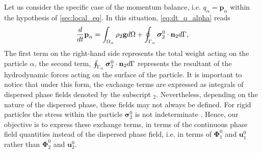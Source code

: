 Let us consider the specific case of the momentum balance, i.e. $q_\alpha = \textbf{p}_\alpha$ within the hypothesis of \ref{sec:local_eq}.
In this situation, \ref{eq:dt_q_alpha} reads
\begin{equation}
    \ddt  \textbf{p}_\alpha
    = \intO{ \rho_2\textbf{g} }
    + \intS{ 
         \bm{\sigma}_2^0%
        \cdot \textbf{n}_2 },
\end{equation}
The first term on the right-hand side represents the total weight acting on the particle $\alpha$, 
the second term, $\oint_{\Gamma_\alpha}  \bm{\sigma}_2^0\cdot\textbf{n}_2  d\Gamma$ represents the resultant of the hydrodynamic forces acting on the surface of the particle.
It is important to notice that under this form, the exchange terms are expressed as integrals of dispersed phase fields denoted by the subscript $_2$.
Nevertheless, depending on the nature of the dispersed phase, these fields may not always be defined.
For rigid particles the stress within the particle $\bm{\sigma}_2^0$ is not indeterminate \citep{guazzelli2011}.  
Hence, our objective is to express these exchange terms, in terms of the continuous phase field quantities instead of the dispersed phase field, i.e. in terms of $\mathbf{\Phi}_1^0$ and $\textbf{u}_1^0$ rather than $\mathbf{\Phi}_2^0$ and $\textbf{u}_2^0$. 

